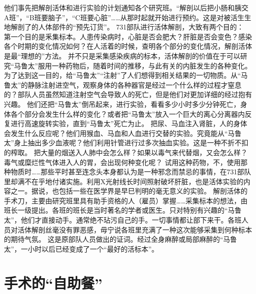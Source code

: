 \documentclass[a4paper,12pt,UTF8,twoside]{ctexbook}
\begin{document}
他们事先把解剖活体和进行实验的计划通知各个研究班。“解剖以后把小肠和胰交A班”，“B班要脑子”，“C班要心脏”……从那时起就开始进行预约。这是对被活生生地解剖了的人体部件的“预先订货”。
731部队进行活体解剖，大致有两个目的：
第一个目的是釆集标本。人患传染病时，心脏是否会肥大？肝脏是否会变色？感染各个时期的变化情况如何？在人活着的时候，查明各个部分的变化情况，解剖活体是最“理想的”方法。
并不只是采集感染疾病的标本，活体解剖的价值在于可以研究“马鲁太”服用一种药物后，随着时间的推移，与此有关的内脏发生的各种变化。
为了达到这一目的，给“马鲁太”“注射”了人们想得到相关结果的一切物质。从“马鲁太”的静脉注射进空气，观察身体的各种器官是经过一个什么样的过程才窒息的？部队人员虽然知道注射空气会导致人的死亡，但是他们对更加详细的经过抱有兴趣。
他们还把“马鲁太”倒吊起来，进行实验，看看多少小时多少分钟死亡，身体各个部分会发生什么样的变化？或者把“马鲁太”放入一个巨大的离心分离器内反复进行高速旋转实验，直到“马鲁太”死亡为止。
把尿、马血注入肾脏，人的身体会发生什么反应呢？他们用猴血、马血和人血进行交替的实验。究竟能从“马鲁太”身上抽出多少血液呢？他们利用针管进行过多次抽血实验。这是一种不折不扣的榨取。
把大量的烟送入人肺中会怎么样？如果以毒气来代替烟，又会怎么样？毒气或糜烂性气体进入人的胃，会出现何种变化呢？
试用这种药物，不，使用那种物质时……那些平时甚至连念头本身都认为是一种邪念而禁忌的事情，在731部队里却满不在乎地付诸实施。利用X光射线长时间照射破坏肝脏，也是活体实验的内容之一。据说，也包括一些在医学界是早巳判明的毫无意义的实验。
解剖活体的手术刀，主要由研究班里具有助手资格的人（雇员）掌握……采集标本的想法，由班长一级提出。各班的班长是当时著名的学者或医生。只对特别有兴趣的“马鲁太”，他们才直接动手。通常绝不玷污自己的手。一切事情都让部下来干。各班人员对活体解剖丝毫没有罪恶感，毋宁说各班里充满了一种这次能够采集到何种标本的期待气氛。
这是原部队人员做出的证词。经过全身麻醉或局部麻醉的“马鲁太”，一小时以后已经变成了一个“最好的活标本”。

\section{手术的“自助餐”}
\end{document}
